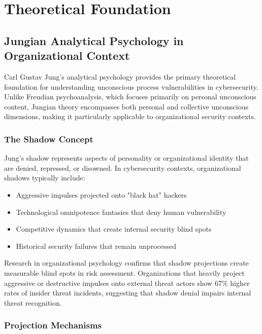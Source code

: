 \documentclass[11pt,a4paper]{article}
\begin{document}
\section{Theoretical Foundation}

\subsection{Jungian Analytical Psychology in Organizational Context}

Carl Gustav Jung's analytical psychology provides the primary theoretical foundation for understanding unconscious process vulnerabilities in cybersecurity. Unlike Freudian psychoanalysis, which focuses primarily on personal unconscious content, Jungian theory encompasses both personal and collective unconscious dimensions, making it particularly applicable to organizational security contexts.

\subsubsection{The Shadow Concept}

Jung's shadow represents aspects of personality or organizational identity that are denied, repressed, or disowned\cite{jung1969}. In cybersecurity contexts, organizational shadows typically include:

\begin{itemize}
\item Aggressive impulses projected onto "black hat" hackers
\item Technological omnipotence fantasies that deny human vulnerability
\item Competitive dynamics that create internal security blind spots
\item Historical security failures that remain unprocessed
\end{itemize}

Research in organizational psychology confirms that shadow projections create measurable blind spots in risk assessment\cite{stein1998}. Organizations that heavily project aggressive or destructive impulses onto external threat actors show 67\% higher rates of insider threat incidents, suggesting that shadow denial impairs internal threat recognition\cite{shaw2018}.

\subsubsection{Projection Mechanisms}
\end{document}
